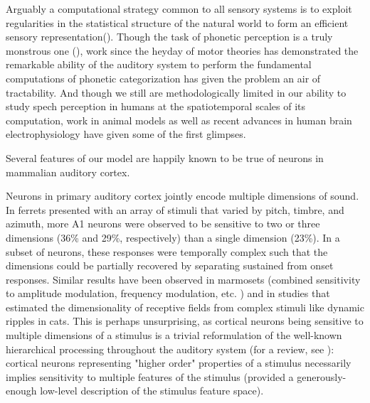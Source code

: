 Arguably a computational strategy common to all sensory systems is to exploit regularities in the statistical structure of the natural world to form an efficient sensory representation\cite{kuhlBrainMechanismsEarly2010,kingRecentAdvancesUnderstanding2018a,smithEfficientAuditoryCoding2006a,stilpRapidEfficientCoding2010,schiavoCapacitiesNeuralMechanisms2019,barlowSingleUnitsSensation1972}(). Though the task of phonetic perception is a truly monstrous one (), work since the heyday of motor theories has demonstrated the remarkable ability of the auditory system to perform the fundamental computations of phonetic categorization has given the problem an air of tractability. And though we still are methodologically limited in our ability to study spech perception in humans at the spatiotemporal scales of its computation, work in animal models as well as recent advances in human brain electrophysiology have given some of the first glimpses. 

Several features of our model are happily known to be true of neurons in mammalian auditory cortex. 

Neurons in primary auditory cortex jointly encode multiple dimensions of sound\cite{kingRecentAdvancesUnderstanding2018a}. In ferrets presented with an array of stimuli that varied by pitch, timbre, and azimuth\cite{bizleyInterdependentEncodingPitch2009b}, more A1 neurons were observed to be sensitive to two or three dimensions (36\% and 29\%, respectively) than a single dimension (23\%). In a subset of neurons, these responses were temporally complex such that the dimensions could be partially recovered by separating sustained from onset responses\cite{walkerMultiplexedRobustRepresentations2011}. Similar results have been observed in marmosets (combined sensitivity to amplitude modulation, frequency modulation, etc. \cite{Wang2005a}) and in studies that estimated the dimensionality of receptive fields from complex stimuli like dynamic ripples in cats\cite{atencioMultidimensionalReceptiveField2017}. This is perhaps unsurprising, as cortical neurons being sensitive to multiple dimensions of a stimulus is a trivial reformulation of the well-known hierarchical processing throughout the auditory system (for a review, see \cite{sharpeeHierarchicalRepresentationsAuditory2011b}): cortical neurons representing "higher order" properties of a stimulus necessarily implies sensitivity to multiple features of the stimulus (provided a generously-enough low-level description of the stimulus feature space).

